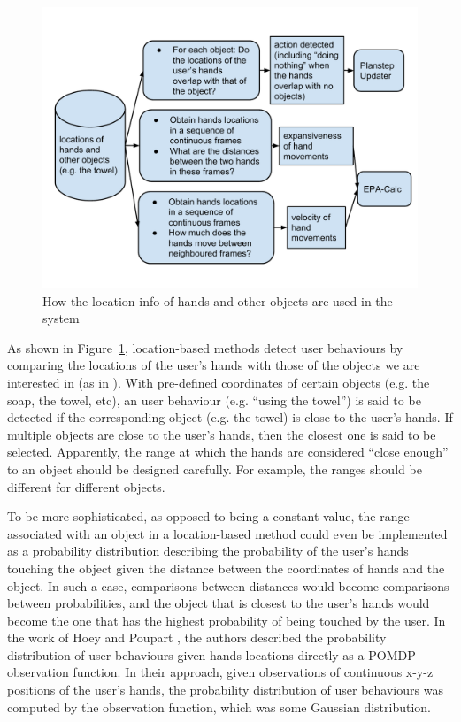 \begin{figure}[h!]
\centering
\includegraphics[width=0.9\linewidth]{fig-location-use.pdf}
\caption{How the location info of hands and other objects are used in the system}
\label{fig:location-use}
\end{figure}

As shown in Figure~\ref{fig:location-use}, location-based methods detect user behaviours by comparing the locations of the user's hands with those of the objects we are interested in (as in \cite{boger2005decision, czarnuch2014}). With pre-defined coordinates of certain objects (e.g. the soap, the towel, etc), an user behaviour (e.g. ``using the towel'') is said to be detected if the corresponding object (e.g. the towel) is close to the user's hands. If multiple objects are close to the user's hands, then the closest one is said to be selected. Apparently, the range at which the hands are considered ``close enough'' to an object should be designed carefully. For example, the ranges should be different for different objects. 

To be more sophisticated, as opposed to being a constant value, the range associated with an object in a location-based method could even be implemented as a probability distribution describing the probability of the user's hands touching the object given the distance between the coordinates of hands and the object. In such a case, comparisons between distances would become comparisons between probabilities, and the object that is closest to the user's hands would become the one that has the highest probability of being touched by the user. In the work of Hoey and Poupart \cite{hoey2005solving}, the authors described the probability distribution of user behaviours given hands locations directly as a POMDP observation function. In their approach, given observations of continuous x-y-z positions of the user's hands, the probability distribution of user behaviours was computed by the observation function, which was some Gaussian distribution.

